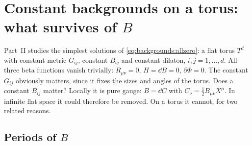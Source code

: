 \section{Constant backgrounds on a torus: what survives of \texorpdfstring{$B$}{B}}
\label{sec:backgrounds:torus}

Part~II studies the simplest solutions of
\eqref{eq:backgrounds:allzero}: a flat torus $T^d$ with constant metric $G_{ij}$, constant
$B_{ij}$ and constant dilaton, $i,j=1,\dots,d$. All three beta functions vanish trivially:
$R_{\mu\nu}=0$, $H=\dd B=0$, $\partial\Phi=0$. The constant $G_{ij}$ obviously matters, since it
fixes the sizes and angles of the torus. Does a constant $B_{ij}$ matter? Locally it is pure
gauge: $B=\dd C$ with $C_\nu=\tfrac12B_{\mu\nu}X^\mu$. In infinite flat space it could
therefore be removed. On a torus it cannot, for two related reasons.

\subsection{Periods of \texorpdfstring{$B$}{B}}

